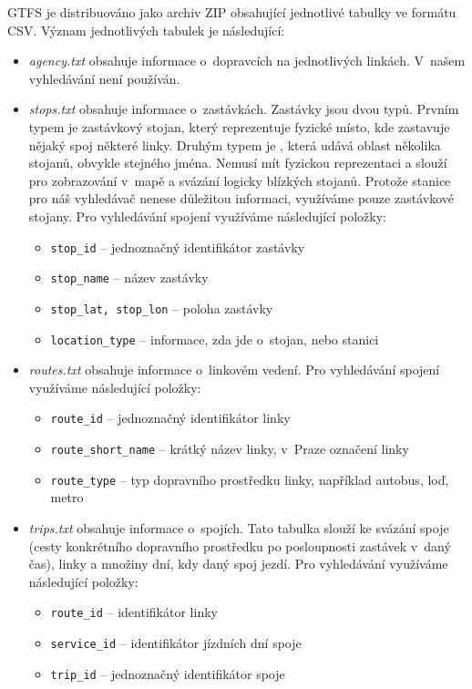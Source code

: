 GTFS je distribuováno jako archiv ZIP obsahující jednotlivé tabulky ve formátu
CSV. Význam jednotlivých tabulek je následující:
\begin{itemize}
\item {\em agency.txt} obsahuje informace o~dopravcích na jednotlivých linkách.
V~našem vyhledávání není používán.
\item {\em stops.txt} obsahuje informace o~zastávkách. Zastávky jsou dvou typů.
Prvním typem je zastávkový stojan, který reprezentuje fyzické místo, kde
zastavuje nějaký spoj některé linky. Druhým typem je , která udává
oblast několika stojanů, obvykle stejného jména. Nemusí mít fyzickou
reprezentaci a slouží pro zobrazování v~mapě a svázání logicky blízkých stojanů.
Protože stanice pro náš vyhledávač nenese důležitou informaci, využíváme pouze
zastávkové stojany. Pro vyhledávání spojení využíváme
následující položky:
\begin{itemize}
	\item {\tt stop\_id} -- jednoznačný identifikátor zastávky
	\item {\tt stop\_name} -- název zastávky
	\item {\tt stop\_lat, stop\_lon} -- poloha zastávky
	\item {\tt location\_type} -- informace, zda jde o~stojan, nebo stanici
\end{itemize}
\item {\em routes.txt} obsahuje informace o~linkovém vedení. Pro vyhledávání
spojení využíváme následující položky:
\begin{itemize}
	\item {\tt route\_id} -- jednoznačný identifikátor linky
	\item {\tt route\_short\_name} -- krátký název linky, v~Praze označení linky
	\item {\tt route\_type} -- typ dopravního prostředku linky, například autobus, loď, metro
\end{itemize}
\item {\em trips.txt} obsahuje informace o~spojích. Tato tabulka slouží ke
svázání spoje (cesty konkrétního dopravního prostředku po posloupnosti zastávek
v~daný čas), linky a množiny dní, kdy daný spoj jezdí. Pro vyhledávání využíváme
následující položky:
\begin{itemize}
	\item {\tt route\_id} -- identifikátor linky
	\item {\tt service\_id} -- identifikátor jízdních dní spoje
	\item {\tt trip\_id} -- jednoznačný identifikátor spoje

\end{itemize}
\end{itemize}
